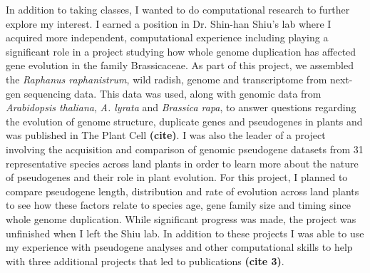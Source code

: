 \documentclass[12pt]{amsart}
\newcommand{\mbh}[1]{\textcolor{red}{ \emph{\scriptsize  #1}} }
\begin{document}
In addition to taking classes, I wanted to do computational research to further explore my interest.  
I earned a position in Dr. Shin-han Shiu's lab where I acquired more independent,  computational experience including playing a significant role in a project studying how whole genome duplication has affected gene evolution in the family Brassicaceae.  
As part of this project, we assembled the \textit{Raphanus raphanistrum}, wild radish, genome and transcriptome from next-gen sequencing data.  
This data was used, along with genomic data from \textit{Arabidopsis thaliana}, \textit{A. lyrata} and \textit{Brassica rapa}, to answer questions regarding the evolution of genome structure, duplicate genes and pseudogenes in plants and was published in The Plant Cell \textbf{(cite)}. 
I was also the leader of a project involving the acquisition and comparison of genomic pseudogene datasets from 31 representative species across land plants in order to learn more about the nature of pseudogenes and their role in plant evolution.  
For this project, I planned to compare pseudogene length, distribution and rate of evolution across land plants to see how these factors relate to species age, gene family size and timing since whole genome duplication.  
While significant progress was made, the project was unfinished when I left the Shiu lab.  
In addition to these projects I was able to use my experience with pseudogene analyses and other computational skills to help with three additional projects that led to publications \textbf{(cite 3)}. %
\end{document}
